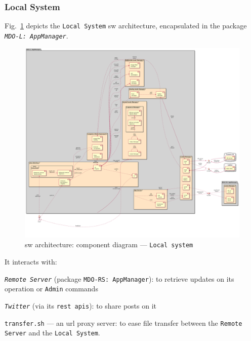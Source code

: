 \subsubsection{Local System}
\label{sec:local-system-arch}
Fig.~\ref{fig:component-diag-local} depicts the \texttt{Local System} \gls{sw} architecture, encapsulated in the package
\emph{\texttt{MDO-L: AppManager}}.
%
\begin{figure}[htb!]
\centering
    \includegraphics[width=1.03\columnwidth]{./img/component-diag-local.png}
  \caption{\gls{sw} architecture: component diagram --- \texttt{Local system}}%
\label{fig:component-diag-local}
\end{figure}

It interacts with:
\begin{item-c}
\item 
\emph{\texttt{Remote Server}} (package \texttt{MDO-RS: AppManager}): to retrieve updates on its operation or
\texttt{Admin} commands
\item
  \emph{\texttt{Twitter}} (via its \texttt{\gls{rest} \glspl{api}}): to share
  posts on it
\item
  \texttt{transfer.sh} --- an \gls{url} proxy server: to ease file transfer
  between the \texttt{Remote Server} and the \texttt{Local System}.
\end{item-c}

